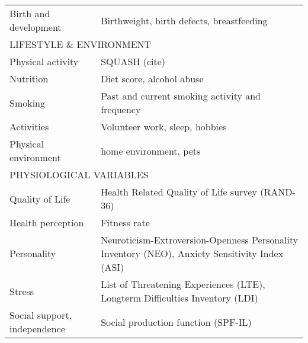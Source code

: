 \begin{table}[H]
{\begin{tabular}{ll}
        Birth and development        & Birthweight, birth defects, breastfeeding                                                      \\
        \multicolumn{2}{l}{LIFESTYLE \& ENVIRONMENT}                                                                                  \\
        Physical activity            & SQUASH (cite)                                                                                  \\
        Nutrition                    & Diet score, alcohol abuse                                                                      \\
        Smoking                      & Past and current smoking activity and frequency                                                \\
        Activities                   & Volunteer work, sleep, hobbies                                                                 \\
        Physical environment         & home environment, pets                                                                         \\
        \multicolumn{2}{l}{PHYSIOLOGICAL VARIABLES}                                                                                   \\
        Quality of Life              & Health Related Quality of Life survey (RAND-36)                                                \\
        Health perception            & Fitness rate                                                                                   \\
        Personality                  & Neuroticism-Extroversion-Openness Personality Inventory (NEO), Anxiety Sensitivity Index (ASI) \\
        Stress                       & List of Threatening Experiences (LTE), Longterm Difficulties Inventory (LDI)                   \\
        Social support, independence & Social production function (SPF-IL)                                                           
    \end{tabular}}
    \label{table:appendix:data_overview_baselines}
\end{table}

